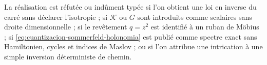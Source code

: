 \begin{criterion}
\label{crit:limite-kepler-sommerfeld}
La réalisation est réfutée ou indûment typée si l'on obtient une loi
en inverse du carré sans déclarer l'isotropie ; si
\(\mathcal K\) ou \(G\) sont introduits comme scalaires sans droite dimensionnelle ;
si le revêtement \(q=z^2\) est identifié à un ruban de Möbius ; si
\eqref{eq:cuantizacion-sommerfeld-holonomia} est publié comme spectre exact
sans Hamiltonien, cycles et indices de Maslov ; ou si l'on attribue
une intrication à une simple inversion déterministe de chemin.
\end{criterion}

